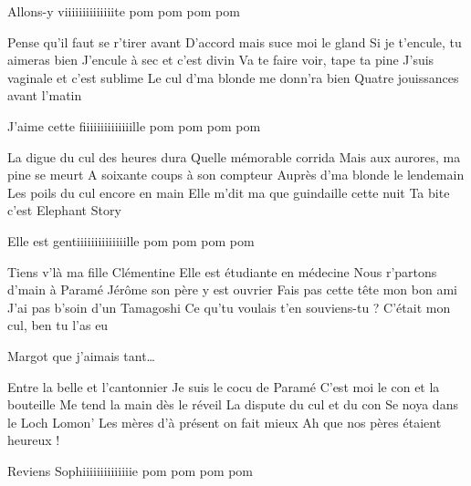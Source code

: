 \beginchorus
Allons-y viiiiiiiiiiiiiite pom pom pom pom
\endchorus

\beginverse
Pense qu’il faut se r’tirer avant
D’accord mais suce moi le gland
Si je t’encule, tu aimeras bien
J’encule à sec et c’est divin
Va te faire voir, tape ta pine
J’suis vaginale et c’est sublime
Le cul d’ma blonde me donn’ra bien
Quatre jouissances avant l’matin
\endverse

\beginchorus
J’aime cette fiiiiiiiiiiiiiille pom pom pom pom
\endchorus

\beginverse
La digue du cul des heures dura
Quelle mémorable corrida
Mais aux aurores, ma pine se meurt
A soixante coups à son compteur
Auprès d’ma blonde le lendemain
Les poils du cul encore en main
Elle m’dit ma que guindaille cette nuit
Ta bite c’est Elephant Story
\endverse

\beginchorus
Elle est gentiiiiiiiiiiiiiille pom pom pom pom
\endchorus

\beginverse
Tiens v’là ma fille Clémentine
Elle est étudiante en médecine
Nous r’partons d’main à Paramé
Jérôme son père y est ouvrier
Fais pas cette tête mon bon ami
J’ai pas b’soin d’un Tamagoshi
Ce qu’tu voulais t’en souviens-tu ?
C’était mon cul, ben tu l’as eu
\endverse

\beginchorus
Margot que j’aimais tant…
\endchorus

\beginverse
Entre la belle et l’cantonnier
Je suis le cocu de Paramé
C’est moi le con et la bouteille
Me tend la main dès le réveil
La dispute du cul et du con
Se noya dans le Loch Lomon’
Les mères d’à présent on fait mieux
Ah que nos pères étaient heureux !
\endverse

\beginchorus
Reviens Sophiiiiiiiiiiiiiie pom pom pom pom
\endchorus

\endsong